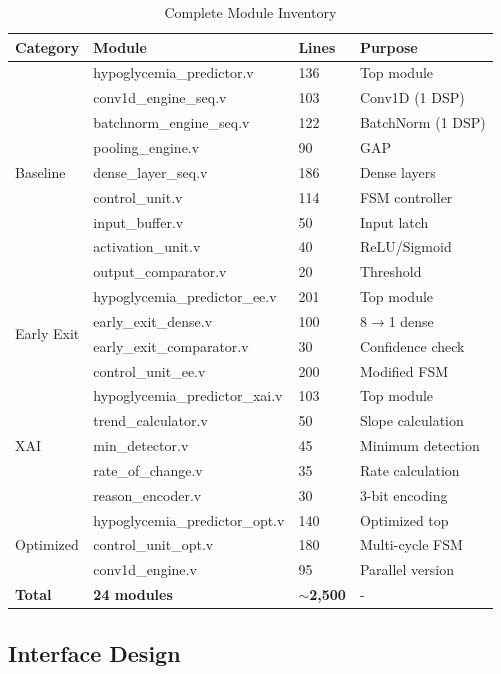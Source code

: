 \documentclass[11pt, a4paper]{article}
\begin{document}
\begin{table}[H]
\centering
\caption{Complete Module Inventory}
\label{tab:modules}
\begin{tabular}{@{}llll@{}}
\toprule
\textbf{Category} & \textbf{Module} & \textbf{Lines} & \textbf{Purpose} \\ \midrule
\multirow{9}{*}{Baseline} 
& hypoglycemia\_predictor.v & 136 & Top module \\
& conv1d\_engine\_seq.v & 103 & Conv1D (1 DSP) \\
& batchnorm\_engine\_seq.v & 122 & BatchNorm (1 DSP) \\
& pooling\_engine.v & 90 & GAP \\
& dense\_layer\_seq.v & 186 & Dense layers \\
& control\_unit.v & 114 & FSM controller \\
& input\_buffer.v & 50 & Input latch \\
& activation\_unit.v & 40 & ReLU/Sigmoid \\
& output\_comparator.v & 20 & Threshold \\ \midrule
\multirow{4}{*}{Early Exit}
& hypoglycemia\_predictor\_ee.v & 201 & Top module \\
& early\_exit\_dense.v & 100 & 8$\to$1 dense \\
& early\_exit\_comparator.v & 30 & Confidence check \\
& control\_unit\_ee.v & 200 & Modified FSM \\ \midrule
\multirow{5}{*}{XAI}
& hypoglycemia\_predictor\_xai.v & 103 & Top module \\
& trend\_calculator.v & 50 & Slope calculation \\
& min\_detector.v & 45 & Minimum detection \\
& rate\_of\_change.v & 35 & Rate calculation \\
& reason\_encoder.v & 30 & 3-bit encoding \\ \midrule
\multirow{3}{*}{Optimized}
& hypoglycemia\_predictor\_opt.v & 140 & Optimized top \\
& control\_unit\_opt.v & 180 & Multi-cycle FSM \\
& conv1d\_engine.v & 95 & Parallel version \\ \midrule
\textbf{Total} & \textbf{24 modules} & \textbf{$\sim$2,500} & - \\ \bottomrule
\end{tabular}
\end{table}

\subsection{Interface Design}
\end{document}
